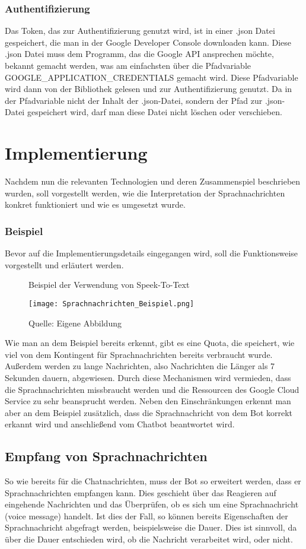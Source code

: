 \subsubsection{Authentifizierung}
Das Token, das zur Authentifizierung genutzt wird, ist in einer .json Datei gespeichert, die man in der Google Developer Console downloaden kann. Diese .json Datei muss dem Programm, das die Google API ansprechen möchte, bekannt gemacht werden, was am einfachsten über die Pfadvariable GOOGLE\_APPLICATION\_CREDENTIALS gemacht wird. Diese Pfadvariable wird dann von der Bibliothek gelesen und zur Authentifizierung genutzt. Da in der Pfadvariable nicht der Inhalt der .json-Datei, sondern der Pfad zur .json-Datei gespeichert wird, darf man diese Datei nicht löschen oder verschieben.

\section{Implementierung}
Nachdem nun die relevanten Technologien und deren Zusammenspiel beschrieben wurden, soll vorgestellt werden, wie die Interpretation der Sprachnachrichten konkret funktioniert und wie es umgesetzt wurde.

\subsubsection{Beispiel}
Bevor auf die Implementierungsdetails eingegangen wird, soll die Funktionsweise vorgestellt und erläutert werden.

\begin{figure}[!htb]
    \centering
    \caption{Beispiel der Verwendung von Speek-To-Text}
      \texttt{[image: Sprachnachrichten\_Beispiel.png]}
      \label{img:speekExample}
    \caption*{Quelle: Eigene Abbildung}
\end{figure}

Wie man an dem Beispiel bereits erkennt, gibt es eine Quota, die speichert, wie viel von dem Kontingent für Sprachnachrichten bereits verbraucht wurde. Außerdem werden zu lange Nachrichten, also Nachrichten die Länger als 7 Sekunden dauern, abgewiesen. Durch diese Mechanismen wird vermieden, dass die Sprachnachrichten missbraucht werden und die Ressourcen des Google Cloud Service zu sehr beansprucht werden.
Neben den Einschränkungen erkennt man aber an dem Beispiel zusätzlich, dass die Sprachnachricht von dem Bot korrekt erkannt wird und anschließend vom Chatbot beantwortet wird.

\subsection{Empfang von Sprachnachrichten}
So wie bereits für die Chatnachrichten, muss der Bot so erweitert werden, dass er Sprachnachrichten empfangen kann. Dies geschieht über das Reagieren auf eingehende Nachrichten und das Überprüfen, ob es sich um eine Sprachnachricht (voice message) handelt. Ist dies der Fall, so können bereits Eigenschaften der Sprachnachricht abgefragt werden, beispielsweise die Dauer. Dies ist sinnvoll, da über die Dauer entschieden wird, ob die Nachricht verarbeitet wird, oder nicht.

